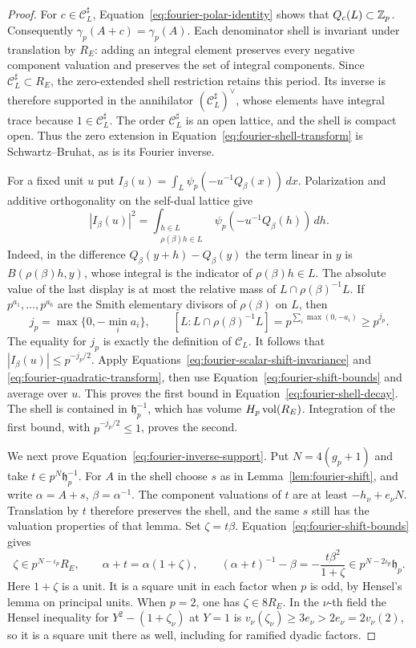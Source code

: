 \begin{proof}
For $c\in\mathcal C_L^\sharp$, Equation~\eqref{eq:fourier-polar-identity}
shows that $Q_c(L)\subset\mathbb Z_p$.  Consequently $\gamma_p(A+c)=\gamma_p(A)$.
Each denominator shell is invariant under translation by $R_E$: adding an
integral element preserves every negative component valuation and preserves
the set of integral components.  Since $\mathcal C_L^\sharp\subset R_E$,
the zero-extended shell restriction retains this period.  Its inverse is
therefore supported in the annihilator $(\mathcal C_L^\sharp)^\vee$, whose
elements have integral trace because $1\in\mathcal C_L^\sharp$.
The order $\mathcal C_L^\sharp$ is an open lattice, and the shell is compact
open.  Thus the zero extension in Equation~\eqref{eq:fourier-shell-transform}
is Schwartz--Bruhat, as is its Fourier inverse.

For a fixed unit $u$ put
$I_\beta(u)=\int_L\psi_p(-u^{-1}Q_\beta(x))\,dx$.
Polarization and additive orthogonality on the self-dual lattice give
\[
 |I_\beta(u)|^2
 =\int_{\substack{h\in L\\\rho(\beta)h\in L}}
       \psi_p(-u^{-1}Q_\beta(h))\,dh.
\]
Indeed, in the difference $Q_\beta(y+h)-Q_\beta(y)$ the term linear in $y$
is $B(\rho(\beta)h,y)$, whose integral is the indicator of
$\rho(\beta)h\in L$.  The absolute value of the last display is at most the
relative mass of $L\cap\rho(\beta)^{-1}L$.  If
$p^{a_1},\ldots,p^{a_6}$ are the Smith elementary divisors of
$\rho(\beta)$ on $L$, then
\[
 j_p=\max\{0,-\min_i a_i\},\qquad
 [L:L\cap\rho(\beta)^{-1}L]
       =p^{\sum_i\max(0,-a_i)}\ge p^{j_p}.
\]
The equality for $j_p$ is exactly the definition of $\mathcal C_L$.
It follows that $|I_\beta(u)|\le p^{-j_p/2}$.  Apply
Equations~\eqref{eq:fourier-scalar-shift-invariance} and
\eqref{eq:fourier-quadratic-transform}, then use
Equation~\eqref{eq:fourier-shift-bounds} and average over $u$.  This proves
the first bound in Equation~\eqref{eq:fourier-shell-decay}.  The shell is
contained in $\mathfrak h_p^{-1}$, which has volume
$H_p\operatorname{vol}(R_E)$.  Integration of the first bound, with $p^{-j_p/2}\le1$,
proves the second.

We next prove Equation~\eqref{eq:fourier-inverse-support}.  Put
$N=4(g_p+1)$ and take $t\in p^N\mathfrak h_p^{-1}$.  For $A$ in the shell
choose $s$ as in Lemma~\ref{lem:fourier-shift}, and write
$\alpha=A+s$, $\beta=\alpha^{-1}$.  The component valuations of $t$ are
at least $-h_\nu+e_\nu N$.  Translation by $t$ therefore preserves the
shell, and the same $s$ still has the valuation properties of that lemma.
Set $\zeta=t\beta$.  Equation~\eqref{eq:fourier-shift-bounds} gives
\[
 \zeta\in p^{N-\iota_p}R_E,\qquad
 \alpha+t=\alpha(1+\zeta),\qquad
 (\alpha+t)^{-1}-\beta
       =-\frac{t\beta^2}{1+\zeta}
       \in p^{N-2\iota_p}\mathfrak h_p.
\]
Here $1+\zeta$ is a unit.  It is a square unit in each factor when $p$ is
odd, by Hensel's lemma on principal units.  When $p=2$, one has
$\zeta\in8R_E$.  In the $\nu$-th field the Hensel inequality for
$Y^2-(1+\zeta_\nu)$ at $Y=1$ is
$v_\nu(\zeta_\nu)\ge3e_\nu>2e_\nu=2v_\nu(2)$, so it is a square unit
there as well, including for ramified dyadic factors.


\end{proof}
